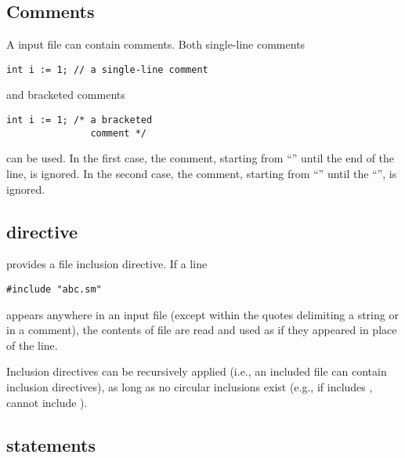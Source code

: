 \subsection{Comments}

A {\smart} input file can contain comments.
Both single-line comments
\lstset{language=smart}
\begin{lstlisting}
int i := 1; // a single-line comment
\end{lstlisting}
and bracketed comments
\begin{lstlisting}
int i := 1; /* a bracketed
               comment */
\end{lstlisting}
can be used.
In the first case, the comment, starting from ``\Code{//}'' until the
end of the line, is ignored.
In the second case, the comment, starting from ``\Code{/*}'' until the
``\Code{*/}'', is ignored.


\subsection{ directive}

{\smart} provides a file inclusion directive.
If a line
\begin{lstlisting}
#include "abc.sm"
\end{lstlisting}
appears anywhere in an input file (except within the quotes delimiting a string
or in a comment), the contents of file  are read and used as if
they appeared in place of the  line.

Inclusion directives can be recursively applied (i.e., an included file
can contain inclusion directives), as long as no circular
inclusions exist (e.g., if  includes ,
 cannot include ).


\subsection{{\smart} statements}

